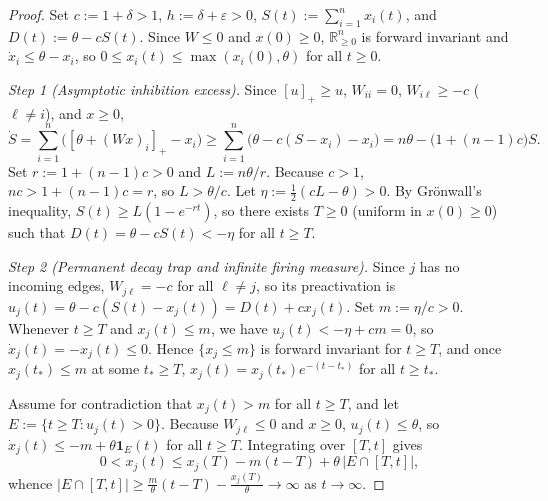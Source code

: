 \documentclass[11pt]{article}
\theoremstyle{plain}
\theoremstyle{definition}
\theoremstyle{remark}
\begin{document}
\begin{proof}
Set $c := 1 + \delta > 1$, $h := \delta + \varepsilon > 0$, $S(t) := \sum_{i=1}^n x_i(t)$, and $D(t) := \theta - c S(t)$. Since $W \le 0$ and $x(0) \ge 0$, $\mathbb{R}_{\ge 0}^n$ is forward invariant and $\dot{x}_i \le \theta - x_i$, so $0 \le x_i(t) \le \max(x_i(0), \theta)$ for all $t \ge 0$.

\emph{Step 1 (Asymptotic inhibition excess).} Since $[u]_+ \ge u$, $W_{ii} = 0$, $W_{i\ell} \ge -c$ ($\ell \neq i$), and $x \ge 0$,
\[
\dot{S} = \sum_{i=1}^n \bigl([\theta + (Wx)_i]_+ - x_i\bigr)
\ge \sum_{i=1}^n \bigl(\theta - c(S - x_i) - x_i\bigr)
= n\theta - \bigl(1 + (n-1)c\bigr)S.
\]
Set $r := 1 + (n-1)c > 0$ and $L := n\theta/r$. Because $c > 1$, $nc > 1 + (n-1)c = r$, so $L > \theta/c$. Let $\eta := \frac{1}{2}(cL - \theta) > 0$. By Gr\"onwall's inequality, $S(t) \ge L(1 - e^{-rt})$, so there exists $T \ge 0$ (uniform in $x(0) \ge 0$) such that $D(t) = \theta - c S(t) < -\eta$ for all $t \ge T$.

\emph{Step 2 (Permanent decay trap and infinite firing measure).} Since $j$ has no incoming edges, $W_{j\ell} = -c$ for all $\ell \neq j$, so its preactivation is $u_j(t) = \theta - c(S(t) - x_j(t)) = D(t) + c x_j(t)$. Set $m := \eta / c > 0$. Whenever $t \ge T$ and $x_j(t) \le m$, we have $u_j(t) < -\eta + cm = 0$, so $\dot{x}_j(t) = -x_j(t) \le 0$. Hence $\{x_j \le m\}$ is forward invariant for $t \ge T$, and once $x_j(t_*) \le m$ at some $t_* \ge T$, $x_j(t) = x_j(t_*) e^{-(t - t_*)}$ for all $t \ge t_*$.

Assume for contradiction that $x_j(t) > m$ for all $t \ge T$, and let $E := \{t \ge T : u_j(t) > 0\}$. Because $W_{j\ell} \le 0$ and $x \ge 0$, $u_j(t) \le \theta$, so $\dot{x}_j(t) \le -m + \theta \mathbf{1}_E(t)$ for all $t \ge T$. Integrating over $[T, t]$ gives
\[
0 < x_j(t) \le x_j(T) - m(t - T) + \theta\,|E \cap [T, t]|,
\]
whence $|E \cap [T, t]| \ge \frac{m}{\theta}(t - T) - \frac{x_j(T)}{\theta} \to \infty$ as $t \to \infty$.


\end{proof}
\end{document}
